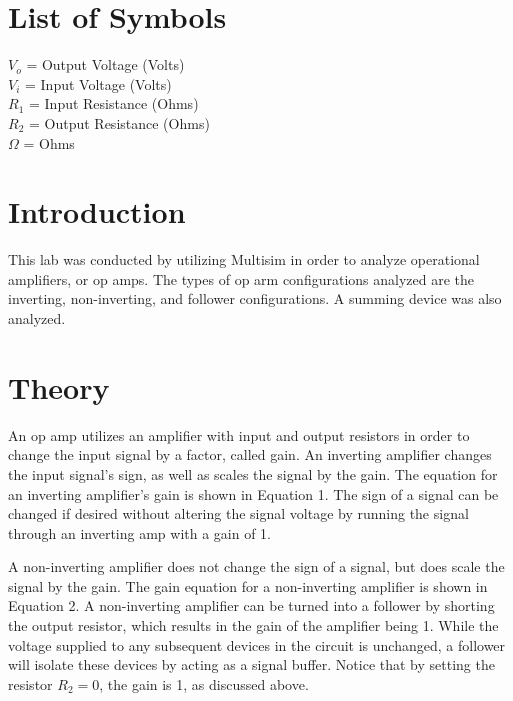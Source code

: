 \documentclass[12pt]{article}
\begin{document}
\section*{\fontsize{12}{12}\selectfont \large List of Symbols}
$V_{o}$ = Output Voltage (Volts)\\
$V_{i}$ = Input Voltage (Volts)\\
$R_{1}$ = Input Resistance (Ohms)\\
$R_{2}$ = Output Resistance (Ohms)\\
$\Omega$ = Ohms

\newpage



\section*{\fontsize{12}{12}\selectfont \large Introduction}
This lab was conducted by utilizing Multisim in order to analyze operational amplifiers, or op amps. The types of op arm configurations analyzed are the inverting, non-inverting, and follower configurations. A summing device was also analyzed.



\section*{\fontsize{12}{12}\selectfont \large Theory}
An op amp utilizes an amplifier with input and output resistors in order to change the input signal by a factor, called gain. An inverting amplifier changes the input signal's sign, as well as scales the signal by the gain. The equation for an inverting amplifier's gain is shown in Equation 1. The sign of a signal can be changed if desired without altering the signal voltage by running the signal through an inverting amp with a gain of 1.
\bigskip

A non-inverting amplifier does not change the sign of a signal, but does scale the signal by the gain. The gain equation for a non-inverting amplifier is shown in Equation 2. A non-inverting amplifier can be turned into a follower by shorting the output resistor, which results in the gain of the amplifier being 1. While the voltage supplied to any subsequent devices in the circuit is unchanged, a follower will isolate these devices by acting as a signal buffer. Notice that by setting the resistor $R_{2} = 0$, the gain is 1, as discussed above.
\bigskip
\end{document}
